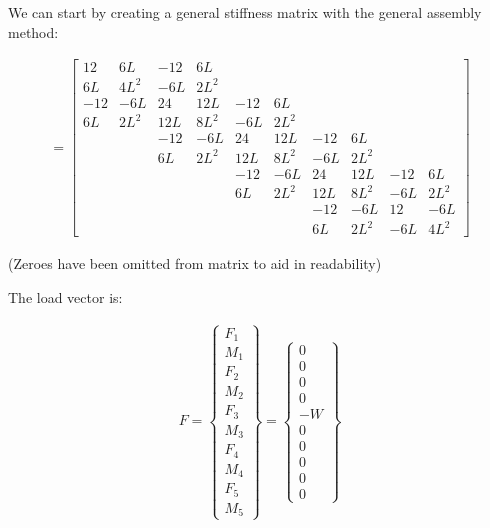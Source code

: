 \documentclass[10pt,letterpaper]{article}
\begin{document}
	We can start by creating a general stiffness matrix with the general assembly method:

	\begin{align}
		[K] = 
		\begin{bmatrix}
12 & 6L & -12 & 6L & & & & & & \\
6L & 4L^2 & -6L & 2L^2 & & & & & & \\
-12 & -6L & 24 & 12L & -12 & 6L & & & & \\
6L & 2L^2 & 12L & 8L^2 & -6L & 2L^2 & & & & \\
 & & -12 & -6L & 24 & 12L & -12 & 6L & & \\
 & & 6L & 2L^2 & 12L & 8L^2 & -6L & 2L^2 & & \\
 & & & & -12 & -6L & 24 & 12L & -12 & 6L \\
 & & & & 6L & 2L^2 & 12L & 8L^2 & -6L & 2L^2 \\
 & & & & & & -12 & -6L & 12 & -6L \\
 & & & & & & 6L & 2L^2 & -6L & 4L^2
		\end{bmatrix}
	\end{align}

	(Zeroes have been omitted from matrix to aid in readability)

	The load vector is:

	\begin{align}
		{F} = 
		\begin{Bmatrix}
			F_1 \\
			M_1 \\
			F_2 \\
			M_2 \\
			F_3 \\
			M_3 \\
			F_4 \\
			M_4 \\
			F_5 \\
			M_5
		\end{Bmatrix} = 
		\begin{Bmatrix}
			0 \\
			0 \\
			0 \\
			0 \\
			-W \\
			0 \\
			0 \\
			0 \\
			0 \\
			0
		\end{Bmatrix}
	\end{align}
\end{document}

